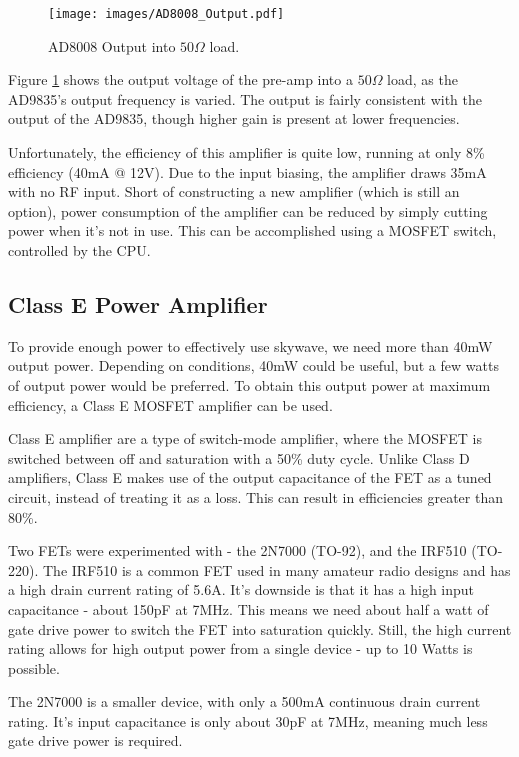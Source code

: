 \documentclass[a4paper,12pt]{article}
\begin{document}
\begin{figure}[h]
  \begin{center}
    \texttt{[image: images/AD8008\_Output.pdf]}
  \end{center}
  \caption{AD8008 Output into $50\Omega$ load.}
  \label{fig:ad8008_output}
\end{figure}

Figure \ref{fig:ad8008_output} shows the output voltage of the pre-amp into a $50\Omega$ load, as the AD9835's output frequency is varied. The output is fairly consistent with the output of the AD9835, though higher gain is present at lower frequencies. 

Unfortunately, the efficiency of this amplifier is quite low, running at only 8\% efficiency (40mA @ 12V). Due to the input biasing, the amplifier draws 35mA with no RF input. Short of constructing a new amplifier (which is still an option), power consumption of the amplifier can be reduced by simply cutting power when it's not in use. This can be accomplished using a MOSFET switch, controlled by the CPU. 

\subsection{Class E Power Amplifier}
To provide enough power to effectively use skywave, we need more than 40mW output power. Depending on conditions, 40mW could be useful, but a few watts of output power would be preferred. To obtain this output power at maximum efficiency, a Class E MOSFET amplifier can be used.

Class E amplifier are a type of switch-mode amplifier, where the MOSFET is switched between off and saturation with a 50\% duty cycle. Unlike Class D amplifiers, Class E makes use of the output capacitance of the FET as a tuned circuit, instead of treating it as a loss. This can result in efficiencies greater than 80\%.

Two FETs were experimented with - the 2N7000 (TO-92), and the IRF510 (TO-220). The IRF510 is a common FET used in many amateur radio designs and has a high drain current rating of 5.6A. It's downside is that it has a high input capacitance - about 150pF at 7MHz. This means we need about half a watt of gate drive power to switch the FET into saturation quickly. Still, the high current rating allows for high output power from a single device - up to 10 Watts is possible.

The 2N7000 is a smaller device, with only a 500mA continuous drain current rating. It's input capacitance is only about 30pF at 7MHz, meaning much less gate drive power is required. 
\end{document}

